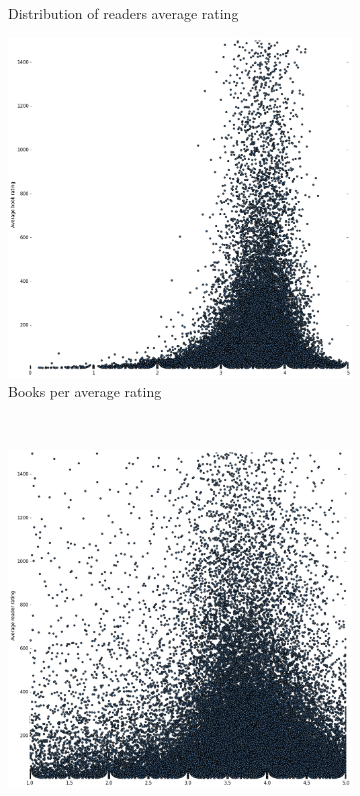 \documentclass[11pt]{article}
\begin{document}
\begin{figure}
\begin{subfigure}[b]{0.5\textwidth}
                \caption{Distribution of readers average rating}
        \end{subfigure}

        \begin{subfigure}[b]{0.5\textwidth}
                \includegraphics[width=\textwidth]{images/book_scatter_1500}
                \caption{Books per average rating}
        \end{subfigure}%
        ~ %
        \begin{subfigure}[b]{0.5\textwidth}
                \includegraphics[width=\textwidth]{images/user_scatter_1500}

\end{subfigure}
\end{figure}
\end{document}
